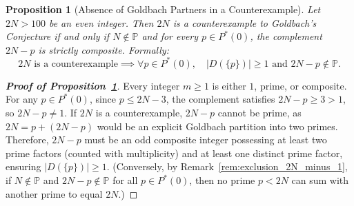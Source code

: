 \documentclass[11pt,a4paper]{article}
\newtheorem{proposition}[theorem]{Proposition}
\theoremstyle{definition}
\begin{document}
\begin{proposition}[Absence of Goldbach Partners in a Counterexample]
\label{prop:compositeness_complements}
Let $2N > 100$ be an even integer. Then $2N$ is a counterexample to Goldbach's Conjecture if and only if $N \notin \mathbb{P}$ and for every $p \in P^*(0)$, the complement $2N - p$ is strictly composite. Formally:
\[
2N \text{ is a counterexample} \implies \forall p \in P^*(0), \quad |D(\{p\})| \ge 1 \text{ and } 2N - p \notin \mathbb{P}.
\]
\end{proposition}
\begin{proof}[\textbf{Proof of Proposition~\ref{prop:compositeness_complements}}]
Every integer $m \ge 1$ is either $1$, prime, or composite. For any $p \in P^*(0)$, since $p \le 2N - 3$, the complement satisfies $2N - p \ge 3 > 1$, so $2N - p \ne 1$. If $2N$ is a counterexample, $2N - p$ cannot be prime, as $2N = p + (2N - p)$ would be an explicit Goldbach partition into two primes. Therefore, $2N - p$ must be an odd composite integer possessing at least two prime factors (counted with multiplicity) and at least one distinct prime factor, ensuring $|D(\{p\})| \ge 1$. (Conversely, by Remark~\ref{rem:exclusion_2N_minus_1}, if $N \notin \mathbb{P}$ and $2N - p \notin \mathbb{P}$ for all $p \in P^*(0)$, then no prime $p < 2N$ can sum with another prime to equal $2N$.)
\end{proof}
\end{document}

